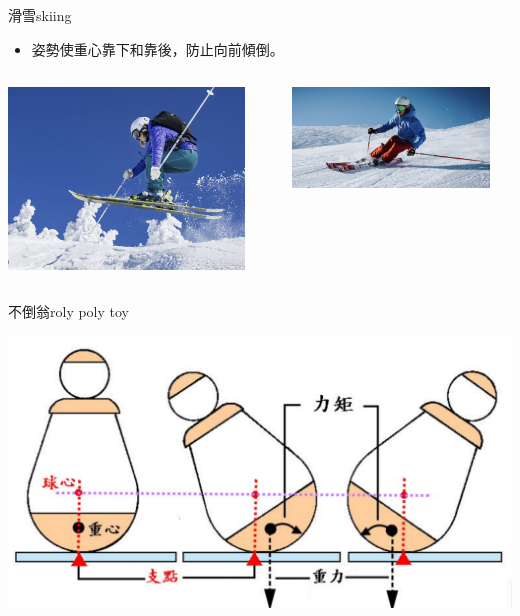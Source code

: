 \documentclass[beamer=true]{standalone}
\begin{document}
\begin{frame}{滑雪skiing}
    \begin{itemize}
        \item 姿勢使重心靠下和靠後，防止向前傾倒。
    \end{itemize}\bigskip
    \begin{columns}
        {\par\centering
            \includegraphics[width=0.9\textwidth]{assets/719dd84e.png}
            \par}
        {\par\centering
            \includegraphics[width=0.9\textwidth]{assets/8e0a1697.png}
            \par}
    \end{columns}


\end{frame}

\begin{frame}{不倒翁roly poly toy}
    \par
    {\par\centering
        \includegraphics[width=.8\textwidth]{assets/c2d6f451.png}
        \par}
\end{frame}
\end{document}
